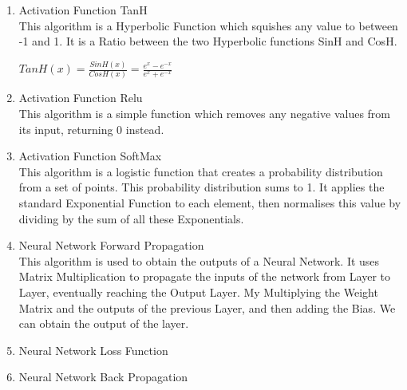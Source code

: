 \begin{flushleft}
\begin{enumerate}
\begin{enumerate}[label=\arabic*)]
                \vspace{0.5cm}
                \item Activation Function TanH \\
                This algorithm is a Hyperbolic Function which squishes any value to between -1 and 1. It is a Ratio between the two Hyperbolic 
                functions SinH and CosH.

                \vspace{0.2cm}
                {\Large\centerline{$TanH(x) = \frac{SinH(x)}{CosH(x)} = \frac{e^x - e^{-x}}{e^x + e^{-x}}$}}
                \vspace{0.2cm}

                \vspace{0.5cm}
                \item Activation Function Relu \\
                This algorithm is a simple function which removes any negative values from its input, returning 0 instead.
                
                \vspace{0.5cm}
                \item Activation Function SoftMax \\
                This algorithm is a logistic function that creates a probability distribution from a set of points. This probability 
                distribution sums to 1. It applies the standard Exponential Function to each element, then normalises this value by dividing
                by the sum of all these Exponentials.

                \vspace{0.5cm}
                \item Neural Network Forward Propagation \\
                This algorithm is used to obtain the outputs of a Neural Network. It uses Matrix Multiplication to propagate the inputs
                of the network from Layer to Layer, eventually reaching the Output Layer. My Multiplying the Weight Matrix and the outputs
                of the previous Layer, and then adding the Bias. We can obtain the output of the layer.
                
                \vspace{0.5cm}
                \item Neural Network Loss Function \\
                
                \vspace{0.5cm}
                \item Neural Network Back Propagation \\
                

\end{enumerate}
\end{enumerate}
\end{flushleft}
